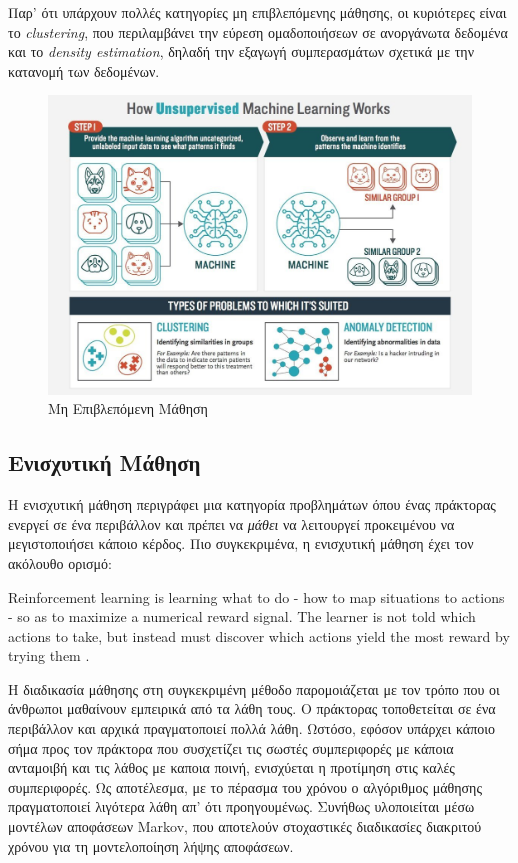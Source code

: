 \medskip
Παρ' ότι υπάρχουν πολλές κατηγορίες μη επιβλεπόμενης μάθησης, οι κυριότερες είναι το \textit{clustering}, που περιλαμβάνει την εύρεση ομαδοποιήσεων σε ανοργάνωτα δεδομένα και το \textit{density estimation}, δηλαδή την εξαγωγή συμπερασμάτων σχετικά με την κατανομή των δεδομένων.

\medskip
\begin{figure}[h]
  \centering
  \includegraphics[scale=0.33]{images/unsuplearn.png}
  \caption{Μη Επιβλεπόμενη Μάθηση}
  \label{fig:unsuplearn}
\end{figure}

\subsection{Ενισχυτική Μάθηση}

Η ενισχυτική μάθηση περιγράφει μια κατηγορία προβλημάτων όπου ένας πράκτορας ενεργεί σε ένα περιβάλλον και πρέπει να \textit{μάθει} να λειτουργεί προκειμένου να μεγιστοποιήσει κάποιο κέρδος. Πιο συγκεκριμένα, η ενισχυτική μάθηση έχει τον ακόλουθο ορισμό:

\medskip
\begin{displayquote}
Reinforcement learning is learning what to do - how to map situations to actions - so as to maximize a numerical reward signal. The learner is not told which actions to take, but instead must discover which actions yield the most reward by trying them \cite{RichardS.Sutton2018}. 
\end{displayquote}

\medskip
Η διαδικασία μάθησης στη συγκεκριμένη μέθοδο παρομοιάζεται με τον τρόπο που οι άνθρωποι μαθαίνουν εμπειρικά από τα λάθη τους. Ο πράκτορας τοποθετείται σε ένα περιβάλλον και αρχικά πραγματοποιεί πολλά λάθη. Ωστόσο, εφόσον υπάρχει κάποιο σήμα προς τον πράκτορα που συσχετίζει τις σωστές συμπεριφορές με κάποια ανταμοιβή και τις λάθος με καποια ποινή, ενισχύεται η προτίμηση στις καλές συμπεριφορές. Ως αποτέλεσμα, με το πέρασμα του χρόνου ο αλγόριθμος μάθησης πραγματοποιεί λιγότερα λάθη απ' ότι προηγουμένως. Συνήθως υλοποιείται μέσω μοντέλων αποφάσεων Markov, που αποτελούν στοχαστικές διαδικασίες διακριτού χρόνου για τη μοντελοποίηση λήψης αποφάσεων.

